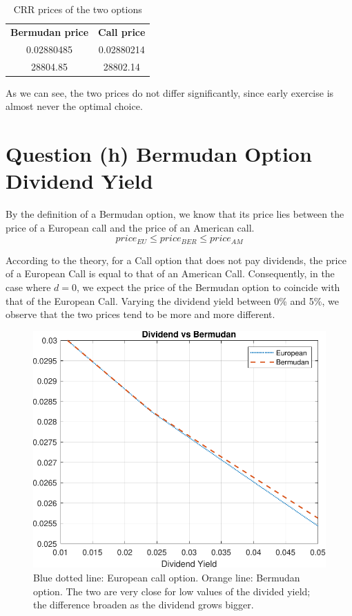 \begin{table}[htpb]
    \centering
    \begin{tabular}{|| c | c ||}
    \hline
        \textbf{Bermudan price} & \textbf{Call price}
        \\0.02880485 & 0.02880214 \\
        28804.85 & 28802.14 \\
    \hline
    \end{tabular}
    \caption{CRR prices of the two options}
    \label{tab:price_b}
\end{table}

As we can see, the two prices do not differ significantly, since early exercise is almost never the optimal choice.

\vspace{1 cm}
\section{Question (h) Bermudan Option Dividend Yield}
By the definition of a Bermudan option, we know that its price lies between the price of a European call and the price of an American call. 
\begin{equation*}
price_{EU} \leq price_{BER} \leq price_{AM}
\end{equation*}

According to the theory, for a Call option that does not pay dividends, the price of a European Call is equal to that of an American Call. Consequently, in the case where $d=0$, we expect the price of the Bermudan option to coincide with that of the European Call.
Varying the dividend yield between 0\% and 5\%, we observe that the two prices tend to be more and more different.

\begin{figure}[htpb]
    \centering
    \includegraphics[width=0.8\linewidth]{imgs/dividend_bermudan.pdf}
    \caption{Blue dotted line: European call option. Orange line: Bermudan option. The two are very close for low values of the divided yield; the difference broaden as the dividend grows bigger.}
    \label{fig:bermudan}
\end{figure}


